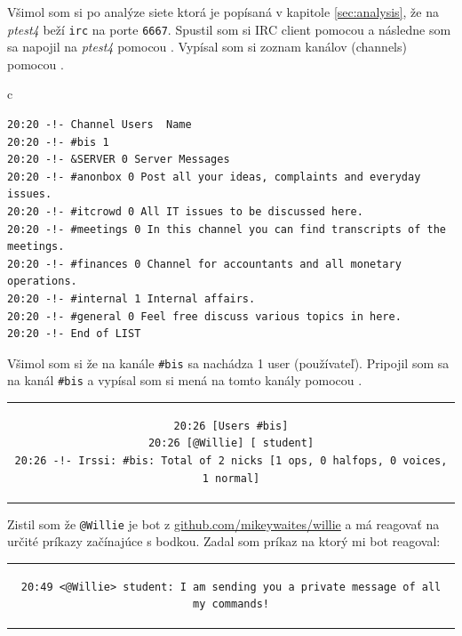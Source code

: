 \documentclass[11pt,a4paper]{article}
\begin{document}
Všimol som si po analýze siete ktorá je popísaná v kapitole \ref{sec:analysis}, že na \textit{ptest4} beží \texttt{irc} na porte \texttt{6667}. Spustil som si IRC client pomocou  a následne som sa napojil na \textit{ptest4} pomocou . Vypísal som si zoznam kanálov (channels) pomocou .

\begin{center}
\begin{tabular}{c}
\begin{lstlisting}[basicstyle=\footnotesize]
20:20 -!- Channel Users  Name
20:20 -!- #bis 1
20:20 -!- &SERVER 0 Server Messages
20:20 -!- #anonbox 0 Post all your ideas, complaints and everyday issues.
20:20 -!- #itcrowd 0 All IT issues to be discussed here.
20:20 -!- #meetings 0 In this channel you can find transcripts of the meetings.
20:20 -!- #finances 0 Channel for accountants and all monetary operations.
20:20 -!- #internal 1 Internal affairs.
20:20 -!- #general 0 Feel free discuss various topics in here.
20:20 -!- End of LIST
\end{lstlisting}
\end{tabular}
\end{center}

Všimol som si že na kanále \texttt{\#bis} sa nachádza 1 user (používateľ). Pripojil som sa na kanál \texttt{\#bis} a vypísal som si mená na tomto kanály pomocou .

\begin{center}
\begin{tabular}{c}
\begin{lstlisting}[basicstyle=\footnotesize]
20:26 [Users #bis]
20:26 [@Willie] [ student]
20:26 -!- Irssi: #bis: Total of 2 nicks [1 ops, 0 halfops, 0 voices, 1 normal]
\end{lstlisting}
\end{tabular}
\end{center}

Zistil som že \texttt{@Willie} je bot z {\color{blue}\href{https://github.com/mikeywaites/willie}{github.com/mikeywaites/willie}} a má reagovať na určité príkazy začínajúce s bodkou. Zadal som príkaz  na ktorý mi bot reagoval:

\begin{center}
\begin{tabular}{c}
\begin{lstlisting}[basicstyle=\footnotesize]
20:49 <@Willie> student: I am sending you a private message of all my commands!
\end{lstlisting}
\end{tabular}
\end{center}
\end{document}
